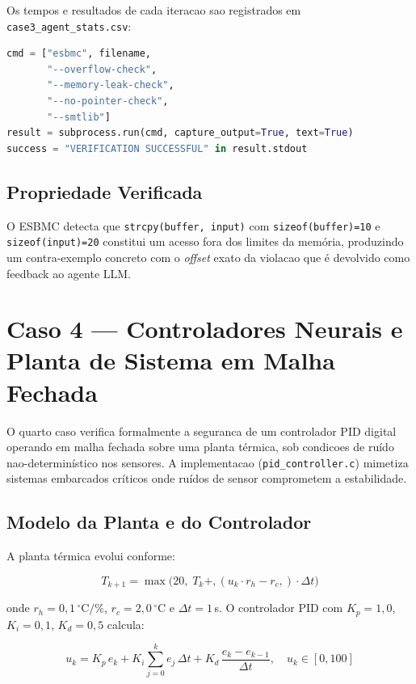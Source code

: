 Os tempos e resultados de cada iteracao sao registrados em \texttt{case3\_agent\_stats.csv}:

\begin{lstlisting}[language=Python, numbers=none]
cmd = ["esbmc", filename,
       "--overflow-check",
       "--memory-leak-check",
       "--no-pointer-check",
       "--smtlib"]
result = subprocess.run(cmd, capture_output=True, text=True)
success = "VERIFICATION SUCCESSFUL" in result.stdout
\end{lstlisting}

\subsection{Propriedade Verificada}

O ESBMC detecta que \texttt{strcpy(buffer, input)} com \texttt{sizeof(buffer)=10} e \texttt{sizeof(input)=20} constitui um acesso fora dos limites da mem\'{o}ria, produzindo um contra-exemplo concreto com o \textit{offset} exato da violacao que \'{e} devolvido como feedback ao agente LLM.


\section{Caso 4 --- Controladores Neurais e Planta de Sistema em Malha Fechada}

O quarto caso verifica formalmente a seguranca de um controlador PID digital operando em malha fechada sobre uma planta t\'{e}rmica, sob condicoes de ru\'{i}do nao-determin\'{i}stico nos sensores. A implementacao (\texttt{pid\_controller.c}) mimetiza sistemas embarcados cr\'{i}ticos onde ru\'{i}dos de sensor comprometem a estabilidade.

\subsection{Modelo da Planta e do Controlador}

A planta t\'{e}rmica evolui conforme:

\begin{equation}\label{eq:plant}
T_{k+1} = \max\!\bigl(20,\; T_k + ,( u_k \cdot r_h - r_c ,) \cdot \Delta t\bigr)
\end{equation}

onde $r_h = 0,1\,^{\circ}\text{C/\%}$, $r_c = 2,0\,^{\circ}\text{C}$ e $\Delta t = 1$\,s. O controlador PID com $K_p = 1{,}0$, $K_i = 0{,}1$, $K_d = 0{,}5$ calcula:

\begin{equation}\label{eq:pid}
u_k = K_p\,e_k + K_i\!\sum_{j=0}^{k} e_j\,\Delta t + K_d\,\frac{e_k - e_{k-1}}{\Delta t}, \quad u_k \in [0, 100]
\end{equation}

